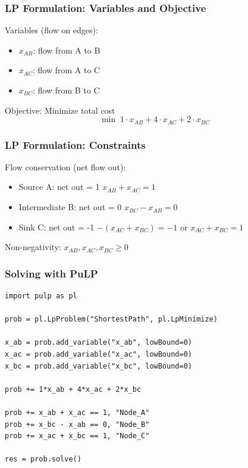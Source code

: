 \documentclass{beamer}
\begin{document}
\begin{frame}
\frametitle{LP Formulation: Variables and Objective}
Variables (flow on edges):
\begin{itemize}
    \item \(x_{AB}\): flow from A to B
    \item \(x_{AC}\): flow from A to C
    \item \(x_{BC}\): flow from B to C
\end{itemize}

Objective: Minimize total cost
\[
\min \; 1 \cdot x_{AB} + 4 \cdot x_{AC} + 2 \cdot x_{BC}
\]
\end{frame}

\begin{frame}[shrink]
\frametitle{LP Formulation: Constraints}

\begin{center}
\end{center}

Flow conservation (net flow out):
\begin{itemize}
  \item Source A: net out = 1 \quad \(x_{AB} + x_{AC} = 1\)
  \item Intermediate B: net out = 0 \quad \(x_{BC} - x_{AB} = 0\)
  \item Sink C: net out = -1 \quad \(-(x_{AC} + x_{BC}) = -1\) or \(x_{AC} + x_{BC} = 1\)
\end{itemize}
Non-negativity: \(x_{AB}, x_{AC}, x_{BC} \ge 0\)
\end{frame}

\begin{frame}[fragile]
\frametitle{Solving with PuLP}
\begin{lstlisting}
import pulp as pl

prob = pl.LpProblem("ShortestPath", pl.LpMinimize)

x_ab = prob.add_variable("x_ab", lowBound=0)
x_ac = prob.add_variable("x_ac", lowBound=0)
x_bc = prob.add_variable("x_bc", lowBound=0)

prob += 1*x_ab + 4*x_ac + 2*x_bc

prob += x_ab + x_ac == 1, "Node_A"
prob += x_bc - x_ab == 0, "Node_B"
prob += x_ac + x_bc == 1, "Node_C"

res = prob.solve()
\end{lstlisting}
\end{frame}
\end{document}
